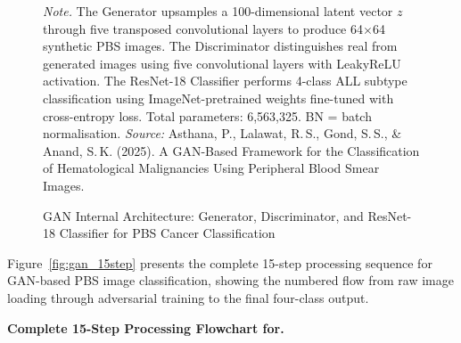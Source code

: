 \begin{figure}[!htbp]
{\begin{tikzpicture}
\end{tikzpicture}%
}
\caption[GAN Internal Architecture]{GAN Internal Architecture: Generator, Discriminator, and ResNet-18 Classifier for PBS Cancer Classification}
\vspace{0.5em}
\noindent\textit{Note.} The Generator upsamples a 100-dimensional latent vector $z$ through five transposed convolutional layers to produce 64$\times$64 synthetic PBS images. The Discriminator distinguishes real from generated images using five convolutional layers with LeakyReLU activation. The ResNet-18 Classifier performs 4-class ALL subtype classification using ImageNet-pretrained weights fine-tuned with cross-entropy loss. Total parameters: 6,563,325. BN = batch normalisation. \textit{Source:} Asthana, P., Lalawat, R.\,S., Gond, S.\,S., \& Anand, S.\,K. (2025). A GAN-Based Framework for the Classification of Hematological Malignancies Using Peripheral Blood Smear Images.
\end{figure}
\fi %

Figure~\ref{fig:gan_15step} presents the complete 15-step processing sequence for GAN-based PBS image classification, showing the numbered flow from raw image loading through adversarial training to the final four-class output.


\iffalse %
\noindent\textbf{Complete 15-Step Processing Flowchart for.}

